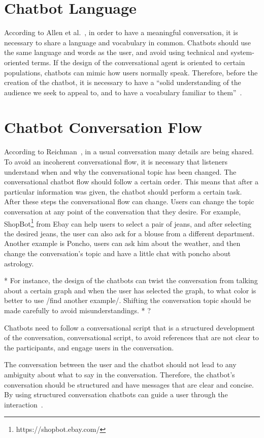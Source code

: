 \documentclass[a4paper,10pt]{article}
\begin{document}
\section{Chatbot Language}
According to Allen et al.~\cite{allen1978conversation}, in order to have a meaningful conversation, it is necessary to share a language and vocabulary in common. Chatbots should use the same language and words as the user, and avoid using technical and system-oriented terms. If the design of the conversational agent is oriented to certain populations, chatbots can mimic how users normally speak.  Therefore, before the creation of the chatbot, it is necessary to have a ``solid understanding of the audience we seek to appeal to, and to have a vocabulary familiar to them”~\cite{HeuristicsWebPage}. 

\section{Chatbot Conversation Flow}
According to Reichman~\cite{reichman1985getting}, in a usual conversation many details are being shared. To avoid an incoherent conversational flow, it is necessary that listeners understand when and why the conversational topic has been changed. The conversational chatbot flow should follow a certain order. This means that after a particular information was given, the chatbot should perform a certain task. After these steps the conversational flow can change. Users can change the topic conversation at any point of the conversation that they desire. For example, ShopBot\footnote{https://shopbot.ebay.com/} from Ebay can help users to select a pair of jeans, and after selecting the desired jeans, the user can also ask for a blouse from a different department. Another example is Poncho, users can ask him about the weather, and then change the conversation's topic and have a little chat with poncho about astrology. 

* For instance, the design of the chatbots can twist the conversation from talking about a certain graph and when the user has selected the graph, to what color is better to use /find another example/. Shifting the conversation topic should be made carefully to avoid misunderstandings.  * ?

Chatbots need to follow a conversational script that is a structured development of the conversation, conversational script, to avoid references that are not clear to the participants, and engage users in the conversation.

The conversation between the user and the chatbot should not lead to any ambiguity about what to say in the conversation. Therefore, the chatbot's conversation should be structured and have messages that are clear and concise. By using structured conversation chatbots can guide a user through the interaction~\cite{HeuristicsWebPage}.
\end{document}
